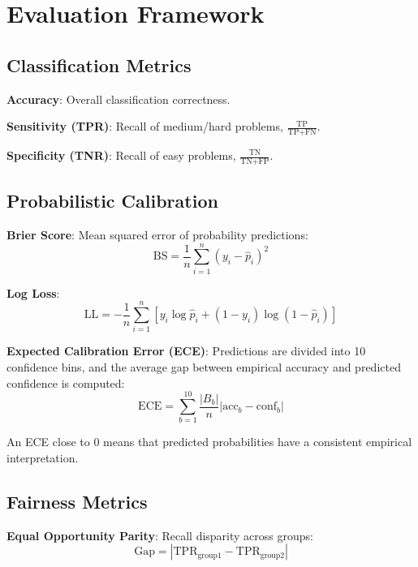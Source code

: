 \documentclass[conference]{IEEEtran}
\begin{document}
\section{Evaluation Framework}

\subsection{Classification Metrics}

\textbf{Accuracy}: Overall classification correctness.

\textbf{Sensitivity (TPR)}: Recall of medium/hard problems, $\frac{\text{TP}}{\text{TP+FN}}$.

\textbf{Specificity (TNR)}: Recall of easy problems, $\frac{\text{TN}}{\text{TN+FP}}$.

\subsection{Probabilistic Calibration}

\textbf{Brier Score}: Mean squared error of probability predictions:
\begin{equation}
\text{BS} = \frac{1}{n}\sum_{i=1}^{n}(y_i - \hat{p}_i)^2
\end{equation}

\textbf{Log Loss}:
\begin{equation}
\text{LL} = -\frac{1}{n}\sum_{i=1}^{n}[y_i \log \hat{p}_i + (1-y_i)\log(1-\hat{p}_i)]
\end{equation}

\textbf{Expected Calibration Error (ECE)}: Predictions are divided into 10 confidence bins, and the average gap between empirical accuracy and predicted confidence is computed:
\begin{equation}
\text{ECE} = \sum_{b=1}^{10} \frac{|B_b|}{n} | \text{acc}_b - \text{conf}_b |
\end{equation}

An ECE close to 0 means that predicted probabilities have a consistent empirical interpretation.

\subsection{Fairness Metrics}

\textbf{Equal Opportunity Parity}: Recall disparity across groups:
\begin{equation}
\text{Gap} = |\text{TPR}_{\text{group1}} - \text{TPR}_{\text{group2}}|
\end{equation}
\end{document}
